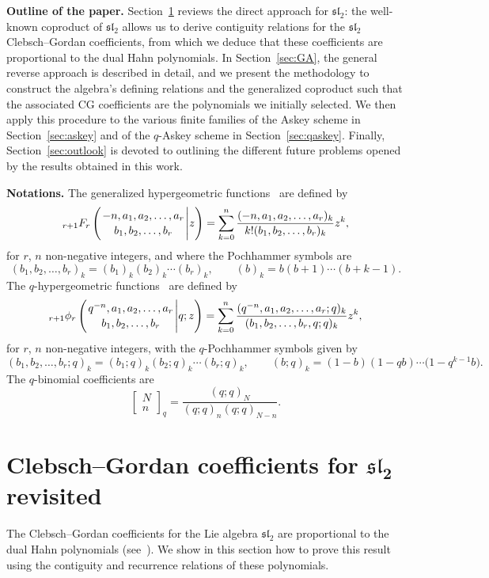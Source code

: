 \documentclass[10pt,a4paper]{amsart}
\numberwithin{equation}{section}
\theoremstyle{definition}
\begin{document}
{\bf Outline of the paper.} Section~\ref{sec:sl2} reviews the direct approach for $\mathfrak{sl}_2$: the well-known coproduct of $\mathfrak{sl}_2$ allows us to derive contiguity relations for the $\mathfrak{sl}_2$ Clebsch--Gordan coefficients, from which we deduce that these coefficients are proportional to the dual Hahn polynomials.
In Section~\ref{sec:GA}, the general reverse approach is described in detail, and we present the methodology to construct the algebra's defining relations and the generalized coproduct such that the associated CG coefficients are the polynomials we initially selected.
We then apply this procedure to the various finite families of the Askey scheme in Section~\ref{sec:askey} and of the $q$-Askey scheme in Section~\ref{sec:qaskey}.
Finally, Section~\ref{sec:outlook} is devoted to outlining the different future problems opened by the results obtained in this work.

{\bf Notations.} The generalized hypergeometric functions~\cite{GR,KLS10} are defined by
\[
{}_{r+1}F_r\left({{-n, a_1, a_2, \dots, a_{r} }\atop
{b_1, b_2, \dots, b_{r} }} \Bigg\vert  z\right)=\sum_{k=0}^{n}
\frac{(-n,a_1,a_2,\dots,a_r)_k}{k!(b_1,b_2,\dots,b_r)_k}z^k,
\]
for $r$, $n$ non-negative integers,
and where the Pochhammer symbols are
\[
(b_1,b_2,\dots,b_r)_k=(b_1)_k(b_2)_k\cdots (b_r)_k,\qquad (b)_k=b(b+1)\cdots (b+k-1).
\]
The $q$-hypergeometric functions~\cite{GR,KLS10} are defined by
\[
{}_{r+1}\phi_r\left({{q^{-n}, a_1, a_2, \dots, a_{r} }\atop
{b_1, b_2, \dots, b_{r} }} \Bigg\vert  q;z\right)=\sum_{k=0}^{n}
\frac{(q^{-n},a_1,a_2,\dots,a_r;q)_k}{(b_1,b_2,\dots,b_r,q;q)_k}z^k,
\]
for $r$, $n$ non-negative integers,
with the $q$-Pochhammer symbols given by
\[
(b_1,b_2,\dots,b_r;q)_k=(b_1;q)_k(b_2;q)_k\cdots (b_r;q)_k,\qquad (b;q)_k=(1-b)(1-qb)\cdots \bigl(1-q^{k-1}b\bigr).
\]
The $q$-binomial coefficients are
\[
 \left[\begin{array}{c}
 N \\
 n
\end{array}\right]_q =\frac{(q;q)_N}{(q;q)_n(q;q)_{N-n}}.
\]

\section[Clebsch--Gordan coefficients for sl\_2 revisited]{Clebsch--Gordan coefficients for $\boldsymbol{\mathfrak{sl}_2}$ revisited}\label{sec:sl2}

The Clebsch--Gordan coefficients for the Lie algebra $\mathfrak{sl}_2$ are proportional to the dual Hahn polynomials (see~\cite{Koor,NUV,Racah}). We show in this section how to prove this result using the contiguity and recurrence relations of these polynomials.
\end{document}
